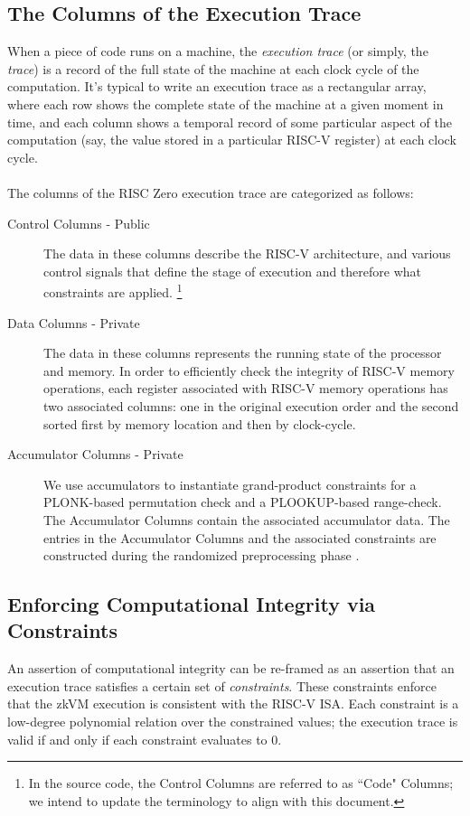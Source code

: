 \documentclass[10pt,letterpaper,titlepage]{article}
\theoremstyle{definition}
\begin{document}
\subsection{The Columns of the Execution Trace}
\label{trace}
When a piece of code runs on a machine, the \textit{execution trace} (or simply, the \textit{trace}) is a record of the full state of the machine at each clock cycle of the computation.
It's typical to write an execution trace as a rectangular array, where each row shows the complete state of the machine at a given moment in time, and each column shows a temporal record of some particular aspect of the computation (say, the value stored in a particular RISC-V register) at each clock cycle. \\
\\
The columns of the RISC Zero execution trace are categorized as follows:
\begin{description}
  \item[Control Columns - Public] The data in these columns describe the RISC-V architecture, and various control signals that define the stage of execution and therefore what constraints are applied.%
  \footnote{In the source code, the Control Columns are referred to as ``Code" Columns; we intend to update the terminology to align with this document.}
  \item[Data Columns - Private] The data in these columns represents the running state of the processor and memory.
  In order to efficiently check the integrity of RISC-V memory operations, each register associated with RISC-V memory operations has two associated columns: one in the original execution order and the second sorted first by memory location and then by clock-cycle.
  \item[Accumulator Columns - Private] We use accumulators to instantiate grand-product constraints for a PLONK-based permutation check and a PLOOKUP-based range-check.
  The Accumulator Columns contain the associated accumulator data.
  The entries in the Accumulator Columns and the associated constraints are constructed during the randomized preprocessing phase \cite{plonk, plookup, RAP}. \\
\end{description}

\subsection{Enforcing Computational Integrity via Constraints}
An assertion of computational integrity can be re-framed as an assertion that an execution trace satisfies a certain set of \textit{constraints}.
These constraints enforce that the zkVM execution is consistent with the RISC-V ISA.
Each constraint is a low-degree polynomial relation over the constrained values; the execution trace is valid if and only if each constraint evaluates to 0.
\end{document}
